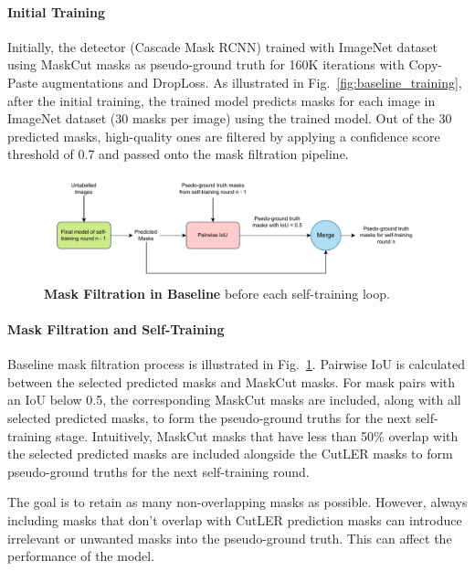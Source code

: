 \paragraph{Initial Training}
Initially, the detector (Cascade Mask RCNN) trained with  ImageNet dataset using MaskCut masks as pseudo-ground truth for 160K iterations with Copy-Paste augmentations and DropLoss. As illustrated in Fig.~\ref{fig:baseline_training}, after the initial training, the trained model predicts masks for each image in ImageNet dataset (30 masks per image) using the trained model. Out of the 30 predicted masks, high-quality ones are filtered by applying a confidence score threshold of 0.7 and passed onto the mask filtration pipeline. 

\begin{figure}
	\centering
	\includegraphics[width=1\textwidth]{Images/main/baseline_mask_filtration.pdf}
	\caption[\textbf{Mask Filtration Method in Baseline}]{\textbf{Mask Filtration in Baseline} before each self-training loop.}
	\label{fig:baseline_mask_filtration}
\end{figure}


\paragraph{Mask Filtration and Self-Training}
Baseline mask filtration process is illustrated in Fig.~\ref{fig:baseline_mask_filtration}.  Pairwise IoU is calculated between the selected predicted masks and MaskCut masks. For mask pairs with an IoU below 0.5, the corresponding MaskCut masks are included, along with all selected predicted masks, to form the pseudo-ground truths for the next self-training stage. Intuitively, MaskCut masks that have less than 50\% overlap with the selected predicted masks are included alongside the CutLER masks to form pseudo-ground truths for the next self-training round. 

The goal is to retain as many non-overlapping masks as possible. However, always including masks that don't overlap with CutLER prediction masks can introduce irrelevant or unwanted masks into the pseudo-ground truth. This can affect the performance of the model.

